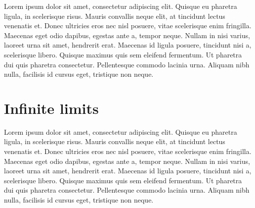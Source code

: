 \documentclass[english,aps,prd,nofootinbib,twocolumn]{revtex4-1}
\begin{document}
Lorem ipsum dolor sit amet, consectetur adipiscing elit. Quisque eu pharetra ligula, in scelerisque risus. Mauris convallis neque elit, at tincidunt lectus venenatis et. Donec ultricies eros nec nisl posuere, vitae scelerisque enim fringilla. Maecenas eget odio dapibus, egestas ante a, tempor neque. Nullam in nisi varius, laoreet urna sit amet, hendrerit erat. Maecenas id ligula posuere, tincidunt nisi a, scelerisque libero. Quisque maximus quis sem eleifend fermentum. Ut pharetra dui quis pharetra consectetur. Pellentesque commodo lacinia urna. Aliquam nibh nulla, facilisis id cursus eget, tristique non neque.


\appendix
\section{Infinite limits}

Lorem ipsum dolor sit amet, consectetur adipiscing elit. Quisque eu pharetra ligula, in scelerisque risus. Mauris convallis neque elit, at tincidunt lectus venenatis et. Donec ultricies eros nec nisl posuere, vitae scelerisque enim fringilla. Maecenas eget odio dapibus, egestas ante a, tempor neque. Nullam in nisi varius, laoreet urna sit amet, hendrerit erat. Maecenas id ligula posuere, tincidunt nisi a, scelerisque libero. Quisque maximus quis sem eleifend fermentum. Ut pharetra dui quis pharetra consectetur. Pellentesque commodo lacinia urna. Aliquam nibh nulla, facilisis id cursus eget, tristique non neque.
\end{document}
